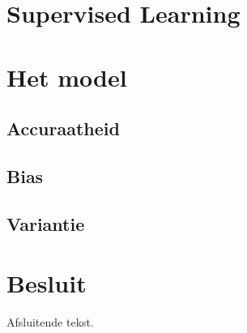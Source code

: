 \documentclass[twoside, kulak]{kulakreport}
\begin{document}
\chapter{Supervised Learning}



\chapter{Het model}

\section{Accuraatheid}

\section{Bias}

\section{Variantie}







\chapter*{Besluit}
Afsluitende tekst.

\nocite{enwiki:1183475870}
\nocite{mediumarticle}



\end{document}
